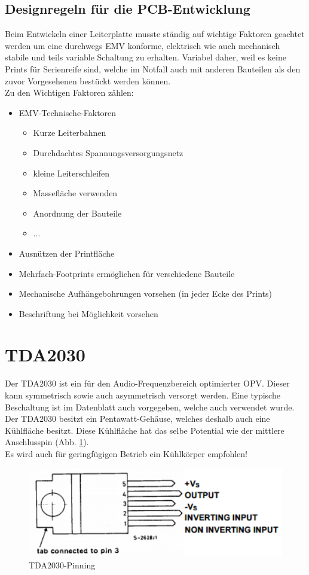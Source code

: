 \subsection{Designregeln für die PCB-Entwicklung}\label{subsec:3.1.2}
Beim Entwickeln einer Leiterplatte musste ständig auf wichtige Faktoren geachtet werden um eine durchwegs EMV konforme, elektrisch wie auch mechanisch stabile und teils variable Schaltung zu erhalten. Variabel daher, weil es keine Prints für Serienreife sind, welche im Notfall auch mit anderen Bauteilen als den zuvor Vorgesehenen bestückt werden können.\\
Zu den Wichtigen Faktoren zählen:
\begin{itemize}
	\item EMV-Technische-Faktoren
	\begin{itemize}
		\item Kurze Leiterbahnen
		\item Durchdachtes Spannungsversorgungsnetz
		\item kleine Leiterschleifen
		\item Massefläche verwenden
		\item Anordnung der Bauteile
		\item ...
	\end{itemize}
	\item Ausnützen der Printfläche
	\item Mehrfach-Footprints ermöglichen für verschiedene Bauteile
	\item Mechanische Aufhängebohrungen vorsehen (in jeder Ecke des Prints)
	\item Beschriftung bei Möglichkeit vorsehen
\end{itemize}




\section{TDA2030}\label{sec:3.2}
Der TDA2030 ist ein für den Audio-Frequenzbereich optimierter OPV. Dieser kann symmetrisch sowie auch asymmetrisch versorgt werden. Eine typische Beschaltung ist im Datenblatt auch vorgegeben, welche auch verwendet wurde. Der TDA2030 besitzt ein Pentawatt-Gehäuse, welches deshalb auch eine Kühlfläche besitzt. Diese Kühlfläche hat das selbe Potential wie der mittlere Anschlusspin (Abb. \ref{fig:3.2.1}).\\
Es wird auch für geringfügigen Betrieb ein Kühlkörper empfohlen!
\begin{figure} [H]
	\centering
	\includegraphics[width=1\textwidth]{img/Print5/TDA2030Pinning.PNG}
	\caption{TDA2030-Pinning}
	\label {fig:3.2.1}
\end{figure}
